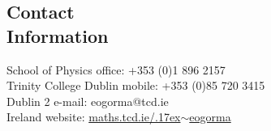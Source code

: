 \documentclass[margin,line]{resume}
\begin{document}
\begin{resume}

    \vspace{2mm}
    \section{\mysidestyle Contact\\Information}

    School of Physics			                            \hfill office: +353 (0)1 896 2157          \vspace{0mm}\\\vspace{0mm}%
    Trinity College Dublin                    				\hfill mobile: +353 (0)85 720 3415  \vspace{0mm}\\\vspace{0mm}%
    Dublin 2											    \hfill e-mail: eogorma@tcd.ie \vspace{0mm}\\\vspace{0mm}%
Ireland					\hfill website: \href{http://www.maths.tcd.ie/~eogorma/index.html}{maths.tcd.ie/{\raise.17ex\hbox{$\scriptstyle\mathtt{\sim}$}}eogorma}
\vspace{0mm}\\\vspace{-4.5mm}%


    \vspace{2mm}

\end{resume}
\end{document}
